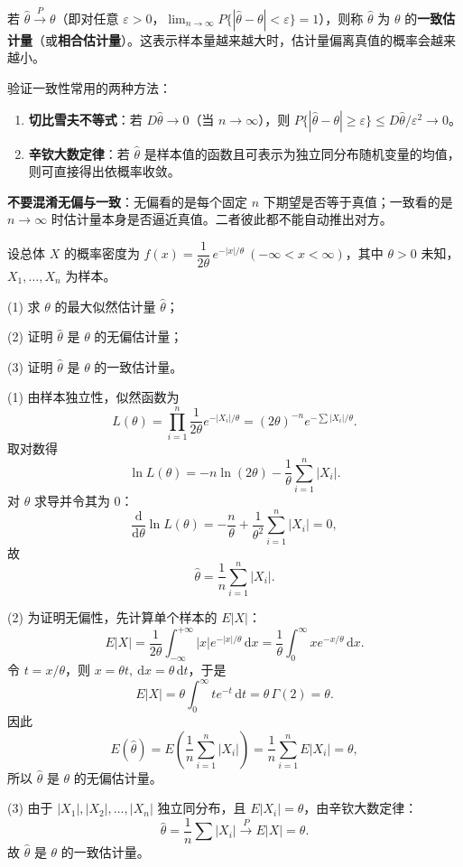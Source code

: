 ﻿\documentclass[lang=cn,11pt]{elegantbook}
\begin{document}
\begin{definition} \label{def:consistent}
若 \(\hat{\theta}\xrightarrow{P}\theta\)（即对任意 \(\varepsilon > 0\)，\(\lim_{n\to\infty}P\{|\hat{\theta}-\theta| < \varepsilon\} = 1\)），则称 \(\hat{\theta}\) 为 \(\theta\) 的\textbf{一致估计量}（或\textbf{相合估计量}）。这表示样本量越来越大时，估计量偏离真值的概率会越来越小。
\end{definition}

\begin{note}
验证一致性常用的两种方法：
\begin{enumerate}
    \item \textbf{切比雪夫不等式}：若 \(D\hat{\theta} \to 0\)（当 \(n\to\infty\)），则 \(P\{|\hat{\theta}-\theta| \geq \varepsilon\} \leq D\hat{\theta}/\varepsilon^2 \to 0\)。
    \item \textbf{辛钦大数定律}：若 \(\hat{\theta}\) 是样本值的函数且可表示为独立同分布随机变量的均值，则可直接得出依概率收敛。
\end{enumerate}
\textbf{不要混淆无偏与一致}：无偏看的是每个固定 \(n\) 下期望是否等于真值；一致看的是 \(n\to\infty\) 时估计量本身是否逼近真值。二者彼此都不能自动推出对方。
\end{note}


\begin{exercise}\label{exer:7-laplace}
设总体 \(X\) 的概率密度为 \(f(x) = \dfrac{1}{2\theta}\,e^{-|x|/\theta}\ (-\infty < x < \infty)\)，其中 \(\theta > 0\) 未知，\(X_1, \dots, X_n\) 为样本。\par
(1) 求 \(\theta\) 的最大似然估计量 \(\hat{\theta}\)；\par
(2) 证明 \(\hat{\theta}\) 是 \(\theta\) 的无偏估计量；\par
(3) 证明 \(\hat{\theta}\) 是 \(\theta\) 的一致估计量。
\end{exercise}
\begin{solution}
(1) 由样本独立性，似然函数为
\[
L(\theta)=\prod_{i=1}^{n}\frac{1}{2\theta}e^{-|X_i|/\theta}
=(2\theta)^{-n}e^{-\sum|X_i|/\theta}.
\]
取对数得
\[
\ln L(\theta)=-n\ln(2\theta)-\frac{1}{\theta}\sum_{i=1}^{n}|X_i|.
\]
对 \(\theta\) 求导并令其为 0：
\[
\frac{\mathrm d}{\mathrm d\theta}\ln L(\theta)
=-\frac{n}{\theta}+\frac{1}{\theta^2}\sum_{i=1}^{n}|X_i|=0,
\]
故
\[
\hat{\theta}=\frac{1}{n}\sum_{i=1}^{n}|X_i|.
\]

(2) 为证明无偏性，先计算单个样本的 \(E|X|\)：
\[
E|X|
=\frac{1}{2\theta}\int_{-\infty}^{+\infty}|x|e^{-|x|/\theta}\,\mathrm{d}x
=\frac{1}{\theta}\int_0^\infty xe^{-x/\theta}\,\mathrm{d}x.
\]
令 \(t=x/\theta\)，则 \(x=\theta t,\ \mathrm dx=\theta\,\mathrm dt\)，于是
\[
E|X|=\theta\int_0^\infty te^{-t}\,\mathrm{d}t=\theta\,\Gamma(2)=\theta.
\]
因此
\[
E(\hat{\theta})=E\!\left(\frac1n\sum_{i=1}^{n}|X_i|\right)=\frac1n\sum_{i=1}^{n}E|X_i|=\theta,
\]
所以 \(\hat{\theta}\) 是 \(\theta\) 的无偏估计量。

(3) 由于 \(|X_1|,|X_2|,\dots,|X_n|\) 独立同分布，且 \(E|X_i|=\theta\)，由辛钦大数定律：
\[
\hat{\theta} = \frac{1}{n}\sum|X_i| \xrightarrow{P} E|X| = \theta. 
\]
故 \(\hat{\theta}\) 是 \(\theta\) 的一致估计量。
\end{solution}
\end{document}

